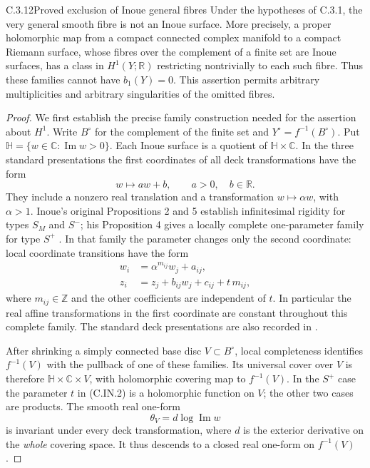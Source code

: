 \begin{idstatement}{C.3.12}{Proved exclusion of Inoue general fibres}
\label{st:C.3.12}
Under the hypotheses of C.3.1, the very general smooth fibre is
not an Inoue surface. More precisely, a proper holomorphic map from
a compact connected complex manifold to a compact Riemann surface,
whose fibres over the complement of a finite set are Inoue surfaces,
has a class in $H^1(Y;\mathbb R)$ restricting nontrivially to each
such fibre. Thus these families cannot have $b_1(Y)=0$.
This assertion permits arbitrary multiplicities and arbitrary
singularities of the omitted fibres.
\end{idstatement}
\begin{proof}
We first establish the precise family construction needed for the
assertion about $H^1$. Write $B^\circ$ for the complement of the
finite set and $Y^\circ=f^{-1}(B^\circ)$. Put
$\mathbb H=\{w\in\mathbb C:\operatorname{Im}w>0\}$.
Each Inoue surface is a quotient of $\mathbb H\times\mathbb C$.
In the three standard presentations the first coordinates of all
deck transformations have the form
\[
 w\longmapsto a w+b,\qquad a>0,\quad b\in\mathbb R.
\tag{C.IN.1}
\]
They include a nonzero real translation and a transformation
$w\mapsto\alpha w$, with $\alpha>1$. Inoue's original
Propositions 2 and 5 establish infinitesimal rigidity for types
$S_M$ and $S^{-}$; his Proposition 4 gives a locally complete
one-parameter family for type $S^{+}$
\cite[pp.~274, 278, 280]{Inoue1974}.
In that family the parameter changes only the second coordinate:
local coordinate transitions have the form
\[
\begin{aligned}
 w_i&=\alpha^{m_{ij}}w_j+a_{ij},\\
 z_i&=z_j+b_{ij}w_j+c_{ij}+t\,m_{ij},
\end{aligned}
\tag{C.IN.2}
\]
where $m_{ij}\in\mathbb Z$ and the other coefficients are
independent of $t$. In particular the real affine transformations
in the first coordinate are constant throughout this complete
family. The standard deck presentations are also recorded in
\cite[Sections 2.1--2.3]{KhaledTeleman2026}.

After shrinking a simply connected base disc $V\subset B^\circ$,
local completeness identifies $f^{-1}(V)$ with the pullback of one
of these families. Its universal cover over $V$ is therefore
$\mathbb H\times\mathbb C\times V$, with holomorphic covering
map to $f^{-1}(V)$. In the $S^{+}$ case the parameter $t$ in
(C.IN.2) is a holomorphic function on $V$; the other two cases
are products. The smooth real one-form
\[
 \theta_V=d\log\operatorname{Im}w
\tag{C.IN.3}
\]
is invariant under every deck transformation, where $d$ is the
exterior derivative on the \emph{whole} covering space. It thus
descends to a closed real one-form on $f^{-1}(V)$.


\end{proof}
